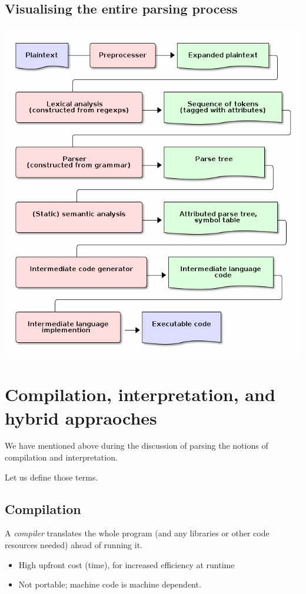 \documentclass[11pt]{article}
\theoremstyle{definition}
\begin{document}
\subsection{Visualising the entire parsing process}
\label{sec:org8c0506c}
\begin{center}
\includegraphics[width=\textwidth]{media/parsing-whole.png}
\end{center}

\section{Compilation, interpretation, and hybrid appraoches}
\label{sec:org05f6599}
We have mentioned above during the discussion of parsing
the notions of compilation and interpretation.

Let us define those terms.

\subsection{Compilation}
\label{sec:org0ca9501}
A \emph{compiler} translates the whole program
(and any libraries or other code resources needed)
ahead of running it.
\begin{itemize}
\item High upfront cost (time), for increased efficiency at runtime
\item Not portable; machine code is machine dependent.
\end{itemize}
\end{document}
